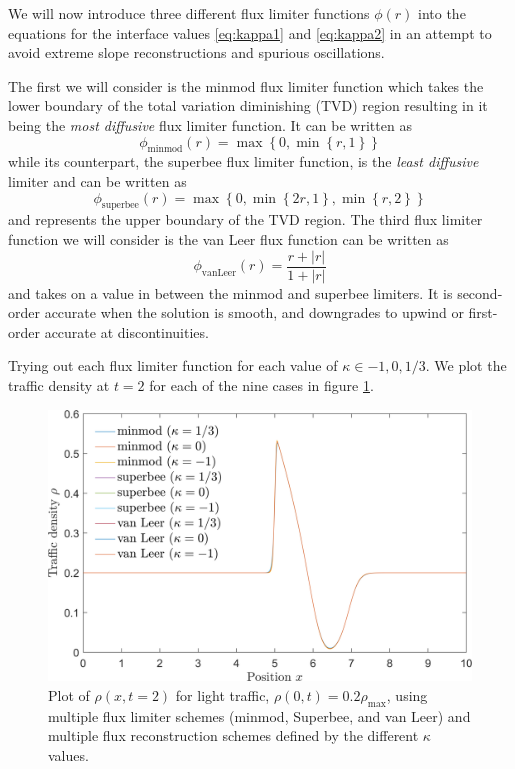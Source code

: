 \documentclass[11pt]{article}
\begin{document}
We will now introduce three different flux limiter functions $\phi(r)$ into the equations for the interface values \eqref{eq:kappa1} and \eqref{eq:kappa2} in an attempt to avoid extreme slope reconstructions and spurious oscillations.

The first we will consider is the minmod flux limiter function which takes the lower boundary of the total variation diminishing (TVD) region resulting in it being the \emph{most diffusive} flux limiter function. It can be written as
\begin{equation}
\phi_\mathrm{minmod}(r) = \max\left\{ 0, \min\left\{r,1\right\} \right\}
\end{equation}
while its counterpart, the superbee flux limiter function, is the \emph{least diffusive} limiter and can be written as 
\begin{equation}
\phi_\mathrm{superbee}(r) = \max \left\{ 0, \min\left\{2r,1\right\}, \min\left\{r,2\right\} \right\}
\end{equation}
and represents the upper boundary of the TVD region. The third flux limiter function we will consider is the van Leer flux function can be written as
\begin{equation}
\phi_\mathrm{van Leer}(r) = \frac{r + |r|}{1 + |r|}
\end{equation}
and takes on a value in between the minmod and superbee limiters. It is second-order accurate when the solution is smooth, and downgrades to upwind or first-order accurate at discontinuities.

Trying out each flux limiter function for each value of $\kappa \in {-1,0,1/3}$. We plot the traffic density at $t=2$ for each of the nine cases in figure \ref{fig:2b_all}.

\begin{figure}[h!]
  \centering
  \includegraphics[width=\textwidth]{2b_all.png}
  \caption{Plot of $\rho(x,t=2)$ for light traffic, $\rho(0,t) = 0.2\rho_\mathrm{max}$, using multiple flux limiter schemes (minmod, Superbee, and van Leer) and multiple flux reconstruction schemes defined by the different $\kappa$ values.}
  \label{fig:2b_all}
\end{figure}
\end{document}
